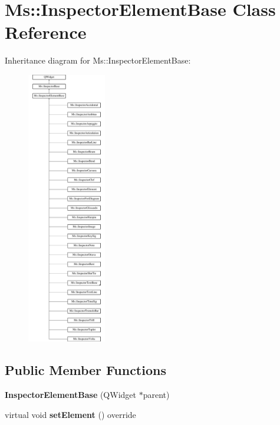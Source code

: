 \hypertarget{class_ms_1_1_inspector_element_base}{}\section{Ms\+:\+:Inspector\+Element\+Base Class Reference}
\label{class_ms_1_1_inspector_element_base}
Inheritance diagram for Ms\+:\+:Inspector\+Element\+Base\+:\begin{figure}[H]
\begin{center}
\leavevmode
\includegraphics[height=12.000000cm]{class_ms_1_1_inspector_element_base}
\end{center}
\end{figure}
\subsection*{Public Member Functions}
\begin{DoxyCompactItemize}
\item 
\mbox{\label{class_ms_1_1_inspector_element_base_a85e04a1dbe7d5f806aab54168e4c3845}} 
{\bfseries Inspector\+Element\+Base} (Q\+Widget $\ast$parent)
\item 
\mbox{\label{class_ms_1_1_inspector_element_base_af3a1245fa8eb1aaf0db98478712d6bf9}} 
virtual void {\bfseries set\+Element} () override
\end{DoxyCompactItemize}
